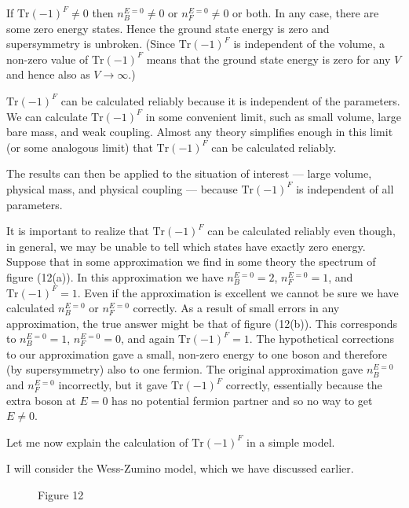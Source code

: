 If $\mathrm{Tr}(-1)^F \neq 0$ then $n_B^{E=0} \neq 0$ or $n_F^{E=0} \neq 0$ or both. In any case,
there are some zero energy states. Hence the ground state energy is
zero and supersymmetry is unbroken. (Since $\mathrm{Tr}(-1)^F$ is independent of
the volume, a non-zero value of $\mathrm{Tr}(-1)^F$ means that the ground state
energy is zero for any $V$ and hence also as $V \to \infty$.)

$\mathrm{Tr}(-1)^F$ can be calculated reliably because it is independent of
the parameters. We can calculate $\mathrm{Tr}(-1)^F$ in some convenient limit,
such as small volume, large bare mass, and weak coupling. Almost any
theory simplifies enough in this limit (or some analogous limit) that
$\mathrm{Tr}(-1)^F$ can be calculated reliably.

The results can then be applied to the situation of interest ---
large volume, physical mass, and physical coupling --- because $\mathrm{Tr}(-1)^F$
is independent of all parameters.

It is important to realize that $\mathrm{Tr}(-1)^F$ can be calculated
reliably even though, in general, we may be unable to tell which
states have exactly zero energy. Suppose that in some approximation
we find in some theory the spectrum of figure (12(a)). In this approximation
we have $n_B^{E=0} = 2$, $n_F^{E=0} = 1$, and $\mathrm{Tr}(-1)^F = 1$. Even if
the approximation is excellent we cannot be sure we have calculated
$n_B^{E=0}$ or $n_F^{E=0}$ correctly. As a result of small errors in any approximation,
the true answer might be that of figure (12(b)). This corresponds
to $n_B^{E=0} = 1$, $n_F^{E=0} = 0$, and again $\mathrm{Tr}(-1)^F = 1$. The hypothetical
corrections to our approximation gave a small, non-zero
energy to one boson and therefore (by supersymmetry) also to one
fermion. The original approximation gave $n_B^{E=0}$ and $n_F^{E=0}$ incorrectly,
but it gave $\mathrm{Tr}(-1)^F$ correctly, essentially because the extra boson at
$E = 0$ has no potential fermion partner and so no way to get $E \neq 0$.

Let me now explain the calculation of $\mathrm{Tr}(-1)^F$ in a simple model.

I will consider the Wess-Zumino model, which we have discussed
earlier.

\begin{figure}[h]
\centering
{}
\caption*{Figure 12}
\end{figure}

